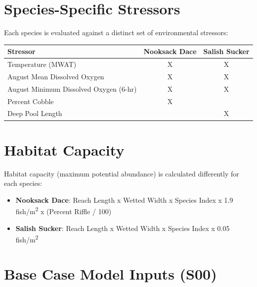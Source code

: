 \documentclass[
  letterpaper,
  DIV=11,
  numbers=noendperiod]{scrreprt}
\providecommand{\tightlist}{%
  \setlength{\itemsep}{0pt}\setlength{\parskip}{0pt}}
\begin{document}
\section*{Species-Specific Stressors}\label{species-specific-stressors}


Each species is evaluated against a distinct set of environmental
stressors:

\begin{longtable}[]{@{}lcc@{}}
\toprule\noalign{}
Stressor & Nooksack Dace & Salish Sucker \\
\midrule\noalign{}
\endhead
\bottomrule\noalign{}
\endlastfoot
Temperature (MWAT) & X & X \\
August Mean Dissolved Oxygen & X & X \\
August Minimum Dissolved Oxygen (6-hr) & X & X \\
Percent Cobble & X & \\
Deep Pool Length & & X \\
\end{longtable}

\section*{Habitat Capacity}\label{habitat-capacity}


Habitat capacity (maximum potential abundance) is calculated differently
for each species:

\begin{itemize}
\tightlist
\item
  \textbf{Nooksack Dace}: Reach Length x Wetted Width x Species Index x
  1.9 fish/m\textsuperscript{2} x (Percent Riffle / 100)
\item
  \textbf{Salish Sucker}: Reach Length x Wetted Width x Species Index x
  0.05 fish/m\textsuperscript{2}
\end{itemize}

\section*{Base Case Model Inputs
(S00)}\label{base-case-model-inputs-s00}

\end{document}
